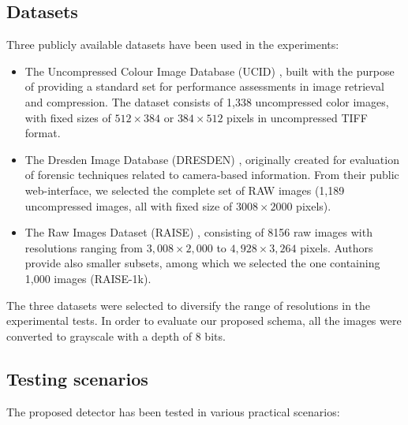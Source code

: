 \documentclass{ieeeaccess}
\begin{document}
\subsection{Datasets}
\label{subsec:datasets}

Three publicly available datasets have been used in the experiments:
\begin{itemize}
	\item The Uncompressed Colour Image Database (UCID) \cite{schaefer2003ucid}, built with the purpose of providing a standard set for performance assessments in image retrieval and compression. The dataset consists of 1,338 uncompressed color images, with fixed sizes of $512\times384$ or $384\times512$ pixels in uncompressed TIFF format.
	\item The Dresden Image Database (DRESDEN) \cite{gloe2010dresden}, originally created for evaluation of forensic techniques related to camera-based information. From their public web-interface, we selected the complete set of RAW images (1,189 uncompressed images, all with fixed size of $3008\times2000$ pixels).
	\item The Raw Images Dataset (RAISE) \cite{dang2015raise}, consisting of 8156 raw images with resolutions ranging from $3,008\times2,000$ to $4,928\times3,264$ pixels. Authors provide also smaller subsets, among which we selected the one containing 1,000 images (RAISE-1k).
\end{itemize}

The three datasets were selected to diversify the range of resolutions in the experimental tests. In order to evaluate our proposed schema, all the images were converted to grayscale with a depth of 8 bits.

\subsection{Testing scenarios}
\label{subsec:test_scenarios}
The proposed detector has been tested in various practical scenarios:%
\end{document}
